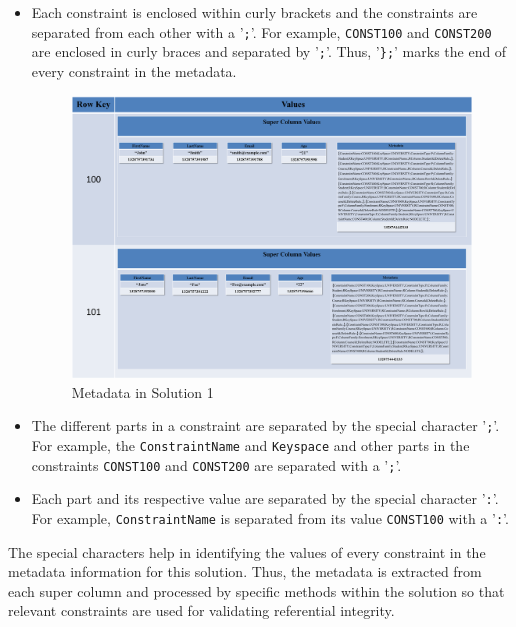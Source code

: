		\begin{itemize}
			\item Each constraint is enclosed within curly brackets and the
			constraints are separated from each other with a
			'\texttt{;}'.  For example,  \texttt{CONST100} and \texttt{CONST200} are
			enclosed in curly braces and separated by '\texttt{;}'. 
			Thus,  '\texttt{\};}' marks the end of every constraint in the metadata. 
		\begin{landscape}
		\begin{figure}
			\centering
			\includegraphics[width=1.4\textwidth]{./figure/Solutions/Sol1-MD-ColumnFamily.png}	
			\caption{Metadata in Solution 1}\label{fd:Metadata-Solution1}
			\end{figure}
		\end{landscape}
		
			\item The different parts in a constraint are separated by the special character
			'\texttt{;}'.  For example,  the \texttt{ConstraintName} and \texttt{Keyspace}
			and other parts in the constraints \texttt{CONST100} and \texttt{CONST200} are
			separated with a '\texttt{;}'.
			 
			 
			\item Each part and its respective value are separated by the special
			character '\texttt{:}'.  For example,  \texttt{ConstraintName} is separated from
			its value \texttt{CONST100} with a '\texttt{:}'.  
			
		\end{itemize}


% 

The special characters help in identifying the values of every constraint in the
metadata information for this solution. Thus, the metadata is extracted from
each super column and processed by specific methods within the solution so that
relevant constraints are used for validating referential integrity.  

